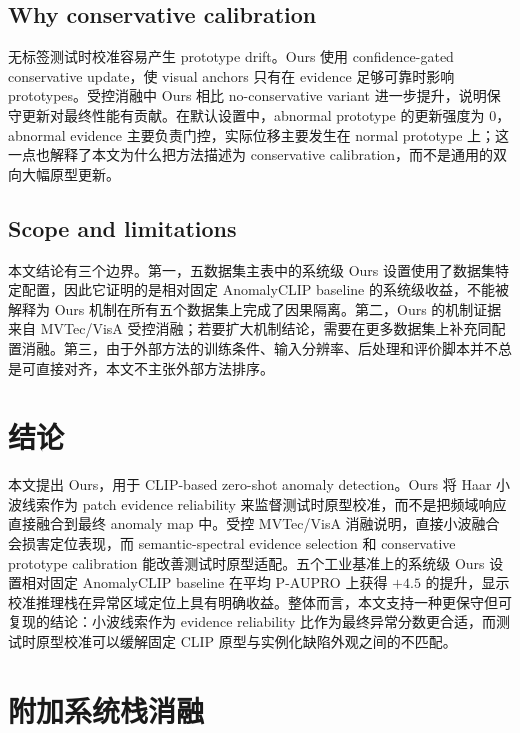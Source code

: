 \documentclass[10pt,a4paper,fontset=none]{ctexart}
\begin{document}
\subsection{Why conservative calibration}

无标签测试时校准容易产生 prototype drift。Ours 使用 confidence-gated conservative update，使 visual anchors 只有在 evidence 足够可靠时影响 prototypes。受控消融中 Ours 相比 no-conservative variant 进一步提升，说明保守更新对最终性能有贡献。在默认设置中，abnormal prototype 的更新强度为 0，abnormal evidence 主要负责门控，实际位移主要发生在 normal prototype 上；这一点也解释了本文为什么把方法描述为 conservative calibration，而不是通用的双向大幅原型更新。

\subsection{Scope and limitations}

本文结论有三个边界。第一，五数据集主表中的系统级 Ours 设置使用了数据集特定配置，因此它证明的是相对固定 AnomalyCLIP baseline 的系统级收益，不能被解释为 Ours 机制在所有五个数据集上完成了因果隔离。第二，Ours 的机制证据来自 MVTec/VisA 受控消融；若要扩大机制结论，需要在更多数据集上补充同配置消融。第三，由于外部方法的训练条件、输入分辨率、后处理和评价脚本并不总是可直接对齐，本文不主张外部方法排序。

\section{结论}

本文提出 Ours，用于 CLIP-based zero-shot anomaly detection。Ours 将 Haar 小波线索作为 patch evidence reliability 来监督测试时原型校准，而不是把频域响应直接融合到最终 anomaly map 中。受控 MVTec/VisA 消融说明，直接小波融合会损害定位表现，而 semantic-spectral evidence selection 和 conservative prototype calibration 能改善测试时原型适配。五个工业基准上的系统级 Ours 设置相对固定 AnomalyCLIP baseline 在平均 P-AUPRO 上获得 $+4.5$ 的提升，显示校准推理栈在异常区域定位上具有明确收益。整体而言，本文支持一种更保守但可复现的结论：小波线索作为 evidence reliability 比作为最终异常分数更合适，而测试时原型校准可以缓解固定 CLIP 原型与实例化缺陷外观之间的不匹配。

\appendix
\section{附加系统栈消融}
\end{document}
